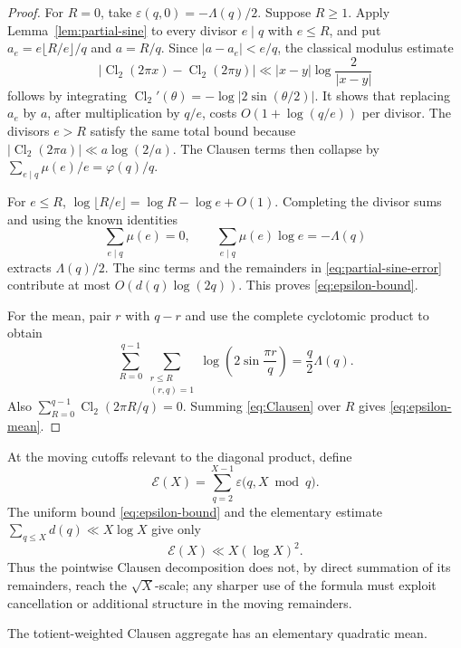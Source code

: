 \documentclass[11pt]{amsart}
\numberwithin{equation}{section}
\theoremstyle{definition}
\theoremstyle{remark}
\newcommand{\eps}{\varepsilon}
\begin{document}
\begin{proof}
For \(R=0\), take \(\eps(q,0)=-\Lambda(q)/2\).  Suppose \(R\geq1\).
Apply Lemma~\ref{lem:partial-sine} to every divisor \(e\mid q\) with
\(e\leq R\), and put
\(a_e=e\lfloor R/e\rfloor/q\) and \(a=R/q\).  Since
\(|a-a_e|<e/q\), the classical modulus estimate
\[
 |\operatorname{Cl}_2(2\pi x)-\operatorname{Cl}_2(2\pi y)|
 \ll |x-y|\log\frac{2}{|x-y|}
\]
follows by integrating
\(\operatorname{Cl}_2'(\theta)=-\log|2\sin(\theta/2)|\).  It shows that
replacing \(a_e\) by \(a\), after multiplication by \(q/e\),
costs \(O(1+\log(q/e))\) per divisor.  The divisors \(e>R\) satisfy the
same total bound because
\(|\operatorname{Cl}_2(2\pi a)|\ll a\log(2/a)\).  The Clausen terms then
collapse by
\(\sum_{e\mid q}\mu(e)/e=\varphi(q)/q\).

For \(e\leq R\),
\(\log\lfloor R/e\rfloor=\log R-\log e+O(1)\).  Completing the divisor
sums and using the known identities
\[
 \sum_{e\mid q}\mu(e)=0,
 \qquad \sum_{e\mid q}\mu(e)\log e=-\Lambda(q)
\]
extracts \(\Lambda(q)/2\).  The sinc terms and the remainders in
\eqref{eq:partial-sine-error} contribute at most
\(O(d(q)\log(2q))\).  This proves \eqref{eq:epsilon-bound}.

For the mean, pair \(r\) with \(q-r\) and use the complete cyclotomic
product to obtain
\[
 \sum_{R=0}^{q-1}\sum_{\substack{r\leq R\\(r,q)=1}}
 \log\!\left(2\sin\frac{\pi r}{q}\right)=\frac q2\Lambda(q).
\]
Also \(\sum_{R=0}^{q-1}\operatorname{Cl}_2(2\pi R/q)=0\).  Summing
\eqref{eq:Clausen} over \(R\) gives \eqref{eq:epsilon-mean}.
\end{proof}

At the moving cutoffs relevant to the diagonal product, define
\begin{equation}\label{eq:mathcalE}
 \mathcal E(X)=\sum_{q=2}^{X-1}\eps\bigl(q,X\bmod q\bigr).
\end{equation}
The uniform bound \eqref{eq:epsilon-bound} and the elementary estimate
\(\sum_{q\leq X}d(q)\ll X\log X\) give only
\begin{equation}\label{eq:mathcalE-bound}
 \mathcal E(X)\ll X(\log X)^2.
\end{equation}
Thus the pointwise Clausen decomposition does not, by direct summation of
its remainders, reach the \(\sqrt X\)-scale; any sharper use of the formula
must exploit cancellation or additional structure in the moving
remainders.

The totient-weighted Clausen aggregate has an elementary quadratic mean.
\end{document}
